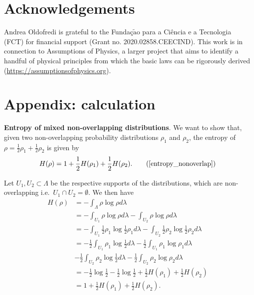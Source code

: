 \documentclass[10pt,twocolumn, nofootinbib]{revtex4-2}
\begin{document}
\section{Acknowledgements}

Andrea Oldofredi is grateful to the Funda\c{c}$\tilde{\mathrm{a}}$o para a Ci\^encia e a Tecnologia (FCT) for financial support (Grant no. 2020.02858.CEECIND).  This work is in connection to Assumptions of Physics, a larger project that aims to identify a handful of physical principles from which the basic laws can be rigorously derived  (\url{https://assumptionsofphysics.org}).


%

\clearpage

\section*{Appendix: calculation}
\label{A}
\textbf{Entropy of mixed non-overlapping distributions}. We want to show that, given two non-overlapping probability distributions $\rho_1$ and $\rho_2$, the entropy of $\rho = \frac{1}{2} \rho_1 + \frac{1}{2} \rho_2$ is given by
\begin{equation}
	H(\rho) = 1 + \frac{1}{2} H(\rho_1) + \frac{1}{2} H(\rho_2). \tag{\ref{entropy_nonoverlap}}
\end{equation}

Let $U_1, U_2 \subset \Lambda$ be the respective supports of the distributions, which are non-overlapping i.e.\ $U_1 \cap U_2 = \emptyset$. We then have
\begin{align*}
	H(\rho) &= - \int_\Lambda \rho \log \rho d\lambda \\
	&= -\int_{U_1} \rho \log \rho d\lambda -\int_{U_2} \rho \log \rho d\lambda \\
	&= -\int_{U_1} \frac{1}{2} \rho_1 \log \frac{1}{2} \rho_1 d\lambda -\int_{U_2} \frac{1}{2} \rho_2 \log \frac{1}{2} \rho_2 d\lambda \\
	&= - \frac{1}{2} \int_{U_1} \rho_1 \log \frac{1}{2} d\lambda - \frac{1}{2} \int_{U_1} \rho_1 \log \rho_1 d\lambda \\
	&- \frac{1}{2} \int_{U_2} \rho_2 \log \frac{1}{2} d\lambda - \frac{1}{2} \int_{U_2} \rho_2 \log \rho_2 d\lambda \\
	&= - \frac{1}{2} \log \frac{1}{2} - \frac{1}{2} \log \frac{1}{2} + \frac{1}{2} H(\rho_1) + \frac{1}{2} H(\rho_2) \\
	&= 1 + \frac{1}{2} H(\rho_1) + \frac{1}{2} H(\rho_2). \\
\end{align*}
\end{document}
